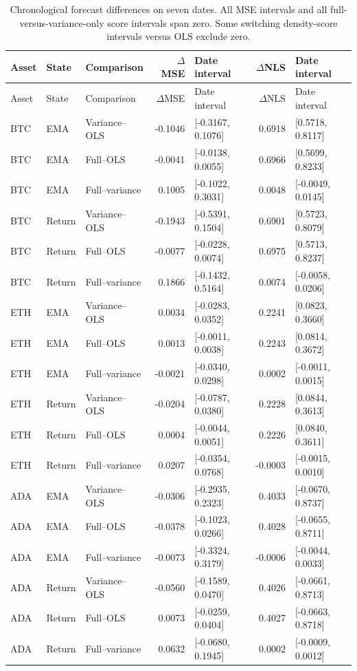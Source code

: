 \documentclass[11pt]{article}
\begin{document}
{\footnotesize
\clearpage\begin{longtable}{lllrlrl}
\caption{Chronological forecast differences on seven dates. All MSE intervals and all full-versus-variance-only score intervals span zero. Some switching density-score intervals versus OLS exclude zero.}\label{tab:regime_market_rebuilt}\\
\toprule Asset & State & Comparison & $\Delta$MSE & Date interval & $\Delta$NLS & Date interval\\\midrule\endfirsthead
\toprule Asset & State & Comparison & $\Delta$MSE & Date interval & $\Delta$NLS & Date interval\\\midrule\endhead
\bottomrule\endfoot
BTC & EMA & Variance--OLS & -0.1046 & [-0.3167, 0.1076] & 0.6918 & [0.5718, 0.8117]\\
BTC & EMA & Full--OLS & -0.0041 & [-0.0138, 0.0055] & 0.6966 & [0.5699, 0.8233]\\
BTC & EMA & Full--variance & 0.1005 & [-0.1022, 0.3031] & 0.0048 & [-0.0049, 0.0145]\\
BTC & Return & Variance--OLS & -0.1943 & [-0.5391, 0.1504] & 0.6901 & [0.5723, 0.8079]\\
BTC & Return & Full--OLS & -0.0077 & [-0.0228, 0.0074] & 0.6975 & [0.5713, 0.8237]\\
BTC & Return & Full--variance & 0.1866 & [-0.1432, 0.5164] & 0.0074 & [-0.0058, 0.0206]\\
ETH & EMA & Variance--OLS & 0.0034 & [-0.0283, 0.0352] & 0.2241 & [0.0823, 0.3660]\\
ETH & EMA & Full--OLS & 0.0013 & [-0.0011, 0.0038] & 0.2243 & [0.0814, 0.3672]\\
ETH & EMA & Full--variance & -0.0021 & [-0.0340, 0.0298] & 0.0002 & [-0.0011, 0.0015]\\
ETH & Return & Variance--OLS & -0.0204 & [-0.0787, 0.0380] & 0.2228 & [0.0844, 0.3613]\\
ETH & Return & Full--OLS & 0.0004 & [-0.0044, 0.0051] & 0.2226 & [0.0840, 0.3611]\\
ETH & Return & Full--variance & 0.0207 & [-0.0354, 0.0768] & -0.0003 & [-0.0015, 0.0010]\\
ADA & EMA & Variance--OLS & -0.0306 & [-0.2935, 0.2323] & 0.4033 & [-0.0670, 0.8737]\\
ADA & EMA & Full--OLS & -0.0378 & [-0.1023, 0.0266] & 0.4028 & [-0.0655, 0.8711]\\
ADA & EMA & Full--variance & -0.0073 & [-0.3324, 0.3179] & -0.0006 & [-0.0044, 0.0033]\\
ADA & Return & Variance--OLS & -0.0560 & [-0.1589, 0.0470] & 0.4026 & [-0.0661, 0.8713]\\
ADA & Return & Full--OLS & 0.0073 & [-0.0259, 0.0404] & 0.4027 & [-0.0663, 0.8718]\\
ADA & Return & Full--variance & 0.0632 & [-0.0680, 0.1945] & 0.0002 & [-0.0009, 0.0012]\\
\end{longtable}
}
\end{document}
